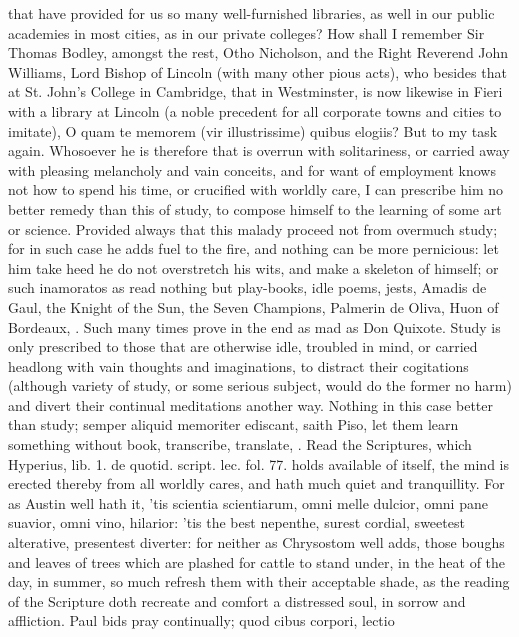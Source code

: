 {that have provided for us so many well-furnished libraries, as well in
our public academies in most cities, as in our private colleges? How
shall I remember Sir Thomas Bodley, amongst the rest, Otho
Nicholson, and the Right Reverend John Williams, Lord Bishop of Lincoln
(with many other pious acts), who besides that at St. John's College in
Cambridge, that in Westminster, is now likewise in Fieri with a library
at Lincoln (a noble precedent for all corporate towns and cities to
imitate), O quam te memorem (vir illustrissime) quibus elogiis? But to
my task again.
Whosoever he is therefore that is overrun with solitariness, or carried
away with pleasing melancholy and vain conceits, and for want of
employment knows not how to spend his time, or crucified with worldly
care, I can prescribe him no better remedy than this of study, to
compose himself to the learning of some art or science. Provided always
that this malady proceed not from overmuch study; for in such case he
adds fuel to the fire, and nothing can be more pernicious: let him take
heed he do not overstretch his wits, and make a skeleton of himself; or
such inamoratos as read nothing but play-books, idle poems, jests,
Amadis de Gaul, the Knight of the Sun, the Seven Champions, Palmerin de
Oliva, Huon of Bordeaux, \etc{}. Such many times prove in the end as mad as
Don Quixote. Study is only prescribed to those that are otherwise idle,
troubled in mind, or carried headlong with vain thoughts and
imaginations, to distract their cogitations (although variety of study,
or some serious subject, would do the former no harm) and divert their
continual meditations another way. Nothing in this case better than
study; semper aliquid memoriter ediscant, saith Piso, let them learn
something without book, transcribe, translate, \etc{}. Read the Scriptures,
which Hyperius, lib. 1. de quotid. script. lec. fol. 77. holds
available of itself, the mind is erected thereby from all worldly
cares, and hath much quiet and tranquillity. For as Austin well
hath it, 'tis scientia scientiarum, omni melle dulcior, omni pane
suavior, omni vino, hilarior: 'tis the best nepenthe, surest cordial,
sweetest alterative, presentest diverter: for neither as
Chrysostom well adds, those boughs and leaves of trees which are
plashed for cattle to stand under, in the heat of the day, in summer,
so much refresh them with their acceptable shade, as the reading of the
Scripture doth recreate and comfort a distressed soul, in sorrow and
affliction. Paul bids pray continually; quod cibus corpori, lectio
}
